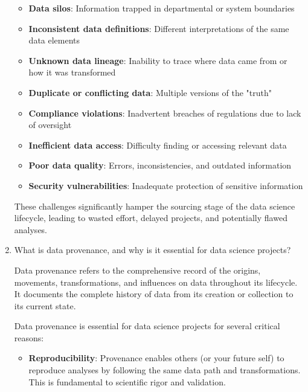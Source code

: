 \documentclass[12pt]{article}
\begin{document}
\begin{enumerate}
\begin{tcolorbox}[colback=blue!5!white,colframe=blue!75!black,title={Solution}]
    \begin{itemize}
        \item \textbf{Data silos}: Information trapped in departmental or system boundaries
        \item \textbf{Inconsistent data definitions}: Different interpretations of the same data elements
        \item \textbf{Unknown data lineage}: Inability to trace where data came from or how it was transformed
        \item \textbf{Duplicate or conflicting data}: Multiple versions of the "truth"
        \item \textbf{Compliance violations}: Inadvertent breaches of regulations due to lack of oversight
        \item \textbf{Inefficient data access}: Difficulty finding or accessing relevant data
        \item \textbf{Poor data quality}: Errors, inconsistencies, and outdated information
        \item \textbf{Security vulnerabilities}: Inadequate protection of sensitive information
    \end{itemize}
    
    These challenges significantly hamper the sourcing stage of the data science lifecycle, leading to wasted effort, delayed projects, and potentially flawed analyses.
    \end{tcolorbox}
    
    \item What is data provenance, and why is it essential for data science projects?
    
    \begin{tcolorbox}[colback=blue!5!white,colframe=blue!75!black,title={Solution}]
    Data provenance refers to the comprehensive record of the origins, movements, transformations, and influences on data throughout its lifecycle. It documents the complete history of data from its creation or collection to its current state.
    
    Data provenance is essential for data science projects for several critical reasons:
    
    \begin{itemize}
        \item \textbf{Reproducibility}: Provenance enables others (or your future self) to reproduce analyses by following the same data path and transformations. This is fundamental to scientific rigor and validation.
        

\end{itemize}
\end{tcolorbox}
\end{enumerate}
\end{document}
